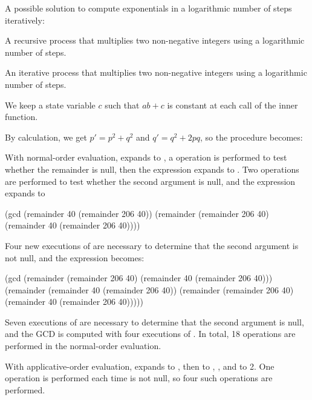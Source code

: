 \begin{exe} %
    A possible solution to compute exponentials in a logarithmic number of steps 
    iteratively:
\end{exe}

\begin{exe} %
    A recursive process that multiplies two non-negative integers using 
    a logarithmic number of steps.
\end{exe}

\begin{exe} %
    An iterative process that multiplies two non-negative integers using 
    a logarithmic number of steps.

    We keep a state variable $c$ such that $ab + c$ is constant at each call 
    of the inner function.
\end{exe}

\begin{exe} %
    By calculation, we get $p' = p^2 + q^2$ and $q' = q^2 + 2pq$, so the 
    procedure becomes:
\end{exe}

\begin{exe} %
    With normal-order evaluation,  expands to
    , a  operation is 
    performed to test whether the remainder is null, then the expression expands 
    to . Two 
     operations are performed to test whether the second 
    argument is null, and the expression expands to
    \begin{cscm}
        (gcd (remainder 40 (remainder 206 40))
             (remainder (remainder 206 40) (remainder 40 (remainder 206 40))))
    \end{cscm}
    Four new executions of  are necessary to determine that the 
    second argument is not null, and the expression becomes:
    \begin{cscm}
        (gcd (remainder (remainder 206 40) (remainder 40 (remainder 206 40)))
             (remainder (remainder 40 (remainder 206 40))
                        (remainder (remainder 206 40)
                                   (remainder 40 (remainder 206 40)))))
    \end{cscm}
    Seven executions of  are necessary to determine that the 
    second argument is null, and the GCD is computed with four executions of 
    . In total, 18  operations are performed in 
    the normal-order evaluation.

    \bigskip

    With applicative-order evaluation,  expands to
    , then to , ,
     and to 2. One  operation is performed each 
    time  is not null, so four such operations are performed.
\end{exe}

